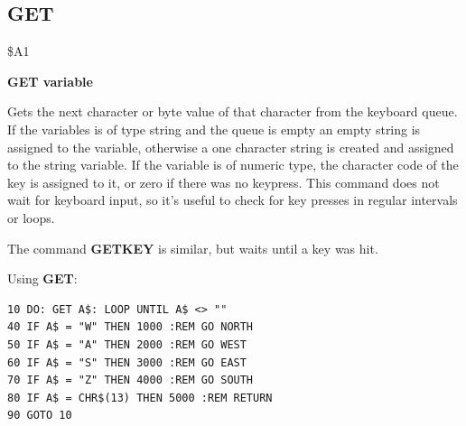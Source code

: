 \subsection{GET}
\begin{description}[leftmargin=2cm,style=nextline]
\item [Token:] \$A1
\item [Format:] {\bf GET variable}
\item [Usage:] Gets the next character or byte value of that character
               from the keyboard queue.
               If the variables is of type string and the queue is empty
               an empty string is assigned to the variable,
               otherwise a one character string is created
               and assigned to the string variable.
               If the variable is of numeric type, the character code
               of the key is assigned to it, or zero if there was no keypress.
               This command does not wait for keyboard
               input, so it's useful to check for key presses
               in regular intervals or loops.

\item [Remarks:] The command {\bf GETKEY} is similar, but waits
                 until a key was hit.

\item [Example:] Using {\bf GET}:
\begin{tcolorbox}[colback=black,coltext=white]
\verbatimfont{\codefont}
\begin{verbatim}
10 DO: GET A$: LOOP UNTIL A$ <> ""
40 IF A$ = "W" THEN 1000 :REM GO NORTH
50 IF A$ = "A" THEN 2000 :REM GO WEST
60 IF A$ = "S" THEN 3000 :REM GO EAST
70 IF A$ = "Z" THEN 4000 :REM GO SOUTH
80 IF A$ = CHR$(13) THEN 5000 :REM RETURN
90 GOTO 10
\end{verbatim}
\end{tcolorbox}
\end{description}


\newpage
